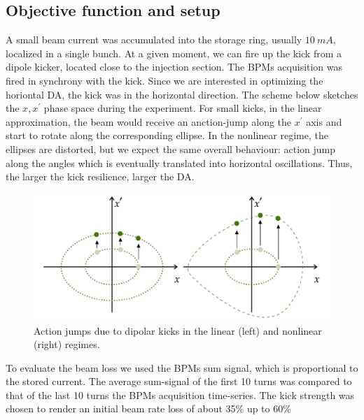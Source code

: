 \subsection{Objective function and setup}
A small beam current was accumulated into the storage ring, usually $10~\unit{mA}$, localized in a single bunch. At a given moment, we can fire up the kick from a dipole kicker, located close to the injection section. The BPMs acquisition was fired in synchrony with the kick. Since we are interested in optimizing the horiontal DA, the kick was in the horizontal direction. The scheme below sketches the $x,x^\prime$ phase space during the experiment. For small kicks, in the linear approximation, the beam would receive an anction-jump along the $x^\prime$ axis and start to rotate along the corresponding ellipse. In the nonlinear regime, the ellipses are distorted, but we expect the same overall behaviour: action jump along the angles which is eventually translated into horizontal oscillations. Thus, the larger the kick resilience, larger the DA.
\begin{figure}
    \centering
    \includegraphics[width=\textwidth]{Images/phase_space_kick.pdf}
    \caption{Action jumps due to dipolar kicks in the linear (left) and nonlinear (right) regimes.}
\end{figure}
To evaluate the beam loss we used the BPMs sum signal, which is proportional to the stored current. The average sum-signal of the first 10 turns was compared to that of the last 10 turns the BPMs acquisition time-series. The kick strength was chosen to render an initial beam rate loss of about 35\% up to 60\%
